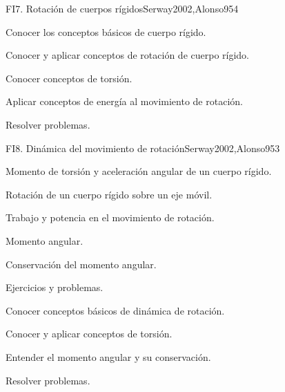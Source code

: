 \begin{syllabus}
\begin{unit}{FI7. Rotación de cuerpos rígidos}{Serway2002,Alonso95}{4}
   \begin{learningoutcomes}
      \item Conocer los conceptos básicos de cuerpo rígido.
      \item Conocer y aplicar conceptos de rotación de cuerpo rígido.
      \item Conocer conceptos de torsión.
      \item Aplicar conceptos de energía al movimiento de rotación.
      \item Resolver problemas.
   \end{learningoutcomes}
\end{unit}

\begin{unit}{FI8. Dinámica del movimiento de rotación}{Serway2002,Alonso95}{3}
\begin{topics}
      \item Momento de torsión y aceleración angular de un cuerpo rígido.
      \item Rotación de un cuerpo rígido sobre un eje móvil.
      \item Trabajo y potencia en el movimiento de rotación.
      \item Momento angular.
      \item Conservación del momento angular.
      \item Ejercicios y problemas.
    \end{topics}

   \begin{learningoutcomes}
      \item Conocer conceptos básicos de dinámica de rotación.
      \item Conocer y aplicar conceptos de torsión.
      \item Entender el momento angular y su conservación.
      \item Resolver problemas.
   \end{learningoutcomes}
\end{unit}

\begin{coursebibliography}
\end{coursebibliography}
\end{syllabus}
